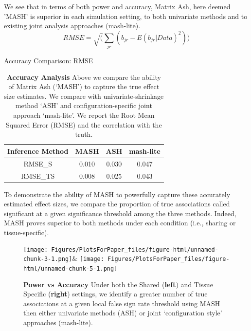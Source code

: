 We see that in terms of both power and accuracy, Matrix Ash, here deemed 'MASH' is superior in each simulation setting, to both univariate methods and to existing joint analysis approaches (mash-lite).
\begin{equation}
RMSE = \sqrt(\sum_{jr}(b_{jr}-E(b_{jr}|Data)^2))
\end{equation}
\begin{table}[ht]
\caption{Accuracy Comparison: RMSE}
\centering
\begin{tabular}{c c c c}
\hline\hline
Inference Method & MASH & ASH & mash-lite \\ [0.5ex] %
\hline
RMSE_{S}&0.010&0.030&0.047\\
RMSE_{TS}&0.008& 0.025&0.043\\ %
\hline
\end{tabular}
\label{table:RMSE}
\caption{\textbf{Accuracy Analysis} Above we compare the ability of Matrix Ash (`MASH') to capture the true effect size estimates. We compare with univariate-shrinkage method `ASH' and configuration-specific joint approach `mash-lite'. We report the Root Mean Squared Error (RMSE) and the correlation with the truth.}
\end{table}

To demonstrate the ability of MASH to powerfully capture these accurately estimated effect sizes, we compare the proportion of true associations called significant at a given significance threshold among the three methods. Indeed, MASH proves superior to both methods under each condition (i.e., sharing or tissue-specific). \newline



\begin{figure}[h]
\texttt{[image: Figures/PlotsForPaper\_files/figure-html/unnamed-chunk-3-1.png]}&
\texttt{[image: Figures/PlotsForPaper\_files/figure-html/unnamed-chunk-5-1.png]}
\caption{\textbf{Power vs Accuracy} Under both the Shared (\textbf{left}) and Tissue Specific (\textbf{right}) settings, we identify a greater number of true associations at a given local false sign rate threshold using MASH then either univariate methods (ASH) or joint `configuration style' approaches (mash-lite).}
\label{fig:powervaccuracy}
\end{figure}\newline

